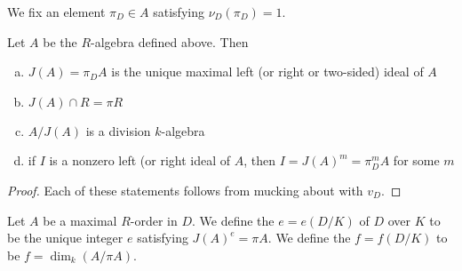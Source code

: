 We fix an element $\pi_D\in A$ satisfying $\nu_D(\pi_D) = 1$.
\begin{prop}
Let $A$ be the $R$-algebra defined above.  Then
\begin{enumerate}[(a)]
\item $J(A) = \pi_DA$ is the unique maximal left (or right or two-sided) ideal of $A$
\item $J(A)\cap R = \pi R$
\item $A/J(A)$ is a division $k$-algebra
\item if $I$ is a nonzero left (or right ideal of $A$, then $I = J(A)^m = \pi_D^mA$ for some $m$
\end{enumerate}
\end{prop}
\begin{proof}
Each of these statements follows from mucking about with $v_D$.
\end{proof}

\begin{defn}
Let $A$ be a maximal $R$-order in $D$.  We define the  $e = e(D/K)$ of $D$ over $K$ to be the unique integer $e$ satisfying $J(A)^e = \pi A$.  We define the  $f = f(D/K)$ to be $f = \dim_k(A/\pi A)$.
\end{defn}

